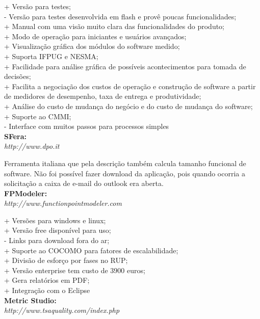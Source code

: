 \begin{apendicesenv}
\noindent + Versão para testes;\\
- Versão para testes desenvolvida em flash e provê poucas funcionalidades;\\
+ Manual com uma visão muito clara das funcionalidades do produto;\\
+ Modo de operação para iniciantes e usuários avançados;\\
+ Visualização gráfica dos módulos do software medido;\\
+ Suporta IFPUG e NESMA;\\
+ Facilidade para análise gráfica de possíveis acontecimentos para tomada de decisões;\\
+ Facilita a negociação dos custos de operação e construção de software a partir de medidores de desempenho, taxa de entrega e produtividade;\\
+ Análise do custo de mudança do negócio e do custo de mudança do software;\\
+ Suporte ao CMMI;\\
- Interface com muitos passos para processos simples\\

\noindent\textbf{SFera:}\\
\textit{http://www.dpo.it}

Ferramenta italiana que pela descrição também calcula tamanho funcional de software. Não foi possível fazer download da aplicação, pois quando ocorria a solicitação a caixa de e-mail do outlook era aberta.\\

\noindent\textbf{FPModeler:}\\
\textit{http://www.functionpointmodeler.com}

\noindent + Versões para windows e linux;\\
+ Versão free disponível para uso;\\
- Links para download fora do ar;\\
+ Suporte ao COCOMO para fatores de escalabilidade;\\
+ Divisão de esforço por fases no RUP;\\
+ Versão enterprise tem custo de 3900 euros;\\
+ Gera relatórios em PDF;\\
+ Integração com o Eclipse\\

\noindent\textbf{Metric Studio:}\\
\textit{http://www.tsaquality.com/index.php}


\end{apendicesenv}
